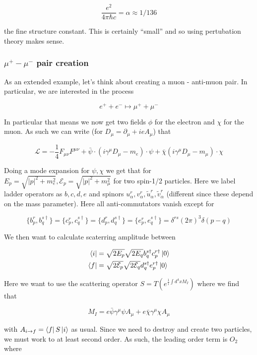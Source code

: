 \documentclass{article}
\theoremstyle{definition}
\begin{document}
$$ \frac{e^2}{4\pi \hbar c} = \alpha \approx 1/136 $$

the fine structure constant. This is certainly ``small'' and so using
pertubation theory makes sense.

\subsubsection{$\mu^+ - \mu^-$ pair creation}

As an extended example, let's think about creating a muon - anti-muon pair. In
particular, we are interested in the process

$$ e^+ + e^- \mapsto \mu^+ + \mu^- $$

In particular that means we now get two fields $\phi$ for the electron and
$\chi$ for the muon. As such we can write (for $D_\mu = \partial_\mu + i e
A_\mu$) that

$$ \mathcal{L} = -\frac{1}{4} F_{\mu \nu} F^{\mu \nu} + \bar{\psi} \cdot (i
\gamma^\mu D_\mu - m_e) \cdot \psi + \bar{\chi} (i \gamma^\mu D_\mu - m_\mu)
\cdot \chi $$

Doing a mode expansion for $\psi, \chi$ we get that for $E_p = \sqrt{|p|^2 +
  m_e^2}, \mathcal{E}_p = \sqrt{|p|^2 + m_\mu^2}$ for two spin-1/2 particles.
Here we label ladder operators as $b, c, d, e$ and spinors $u_\alpha^r,
v_\alpha^r, \tilde{u}_\alpha^r, \tilde{v}_\alpha^r$ (different since these
depend on the mass parameter). Here all anti-commutators vanish except for

$$ \{ b_p^r, b_q^{s\dagger}\} = \{c_p^r, c_q^{s \dagger}\} = \{d_p^r, d_q^{s
  \dagger}\} = \{e_p^r, e_q^{s \dagger}\} = \delta^{rs} (2\pi)^3 \delta(p - q) $$

We then want to calculate scaterring amplitude between

\begin{align*}
\bra{i} &= \sqrt{2 E_p} \sqrt{2 E_q} b_q^{s \dagger} c_p^{r \dagger} \ket{0} \\
\bra{f} &= \sqrt{2 \mathcal{E}_p} \sqrt{2 \mathcal{E}_q} d_q^{s \dagger} e_p^{r \dagger} \ket{0}
\end{align*}

Here we want to use the scattering operator $S = T \left( e^{\frac{1}{i} \int
    d^4x M_I} \right)$ where we find that

$$ M_I = e \bar{\psi} \gamma^\mu \psi A_\mu + e \bar{\chi} \gamma^\mu \chi
A_\mu $$

with $A_{i \to f} = \bra{f} S \ket{i}$ as usual. Since we need to destroy and
create two particles, we must work to at least second order. As such, the
leading order term is $O_2$ where
\end{document}
